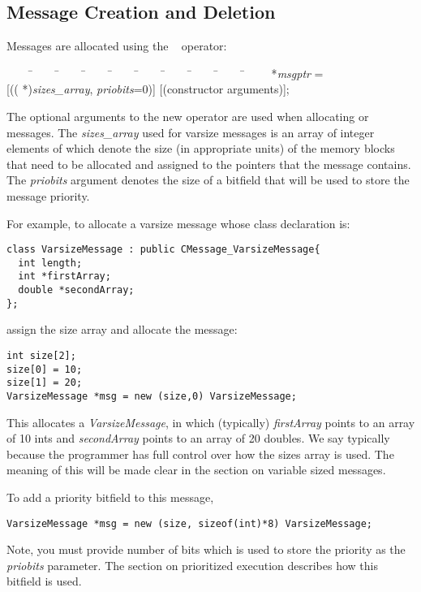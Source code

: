 \subsection{Message Creation and Deletion}
\label{memory allocation}

Messages are allocated using the \CC\  operator:

\begin{tabbing}
~~~~ \=~~~~ \=~~~~ \=~~~~ \=~~~~ \=~~~~ \=~~~~ \=~~~~ \=~~~~ \=~~~~ \kill
\>  *{\it msgptr} = \\
\> \>  [(( *){\it sizes\_array},  {\it priobits}=0)] 
[(constructor arguments)]; \\
\end{tabbing}

The optional arguments to the new operator are used when allocating 
 or  messages. The {\it sizes\_array} 
used for varsize messages is an 
array of integer elements of which denote the size (in appropriate
units) of the memory blocks that need to be allocated and assigned to the
pointers that the message contains. The {\it priobits} argument 
denotes the size of a bitfield that will be used to store the message 
priority.   

For example, to allocate a varsize message whose 
class declaration is:

\begin{verbatim}
class VarsizeMessage : public CMessage_VarsizeMessage{
  int length;
  int *firstArray;
  double *secondArray;
};
\end{verbatim}

assign the size array and allocate the message:
\begin{verbatim}
int size[2];
size[0] = 10;
size[1] = 20;
VarsizeMessage *msg = new (size,0) VarsizeMessage;
\end{verbatim}

This allocates a {\it VarsizeMessage}, in which (typically) {\it firstArray}
points to an array of 10 ints and {\it secondArray} points to an array
of 20 doubles. We say typically because the programmer has full control over 
how the sizes array is used. The meaning of this will be made clear in the 
section on variable sized messages.


To add a priority bitfield to this message, 
\begin{verbatim}
VarsizeMessage *msg = new (size, sizeof(int)*8) VarsizeMessage;
\end{verbatim}
Note, you must provide number of bits which is used to store the priority as 
the {\it priobits} parameter. The section on prioritized execution describes
how this bitfield is used.

